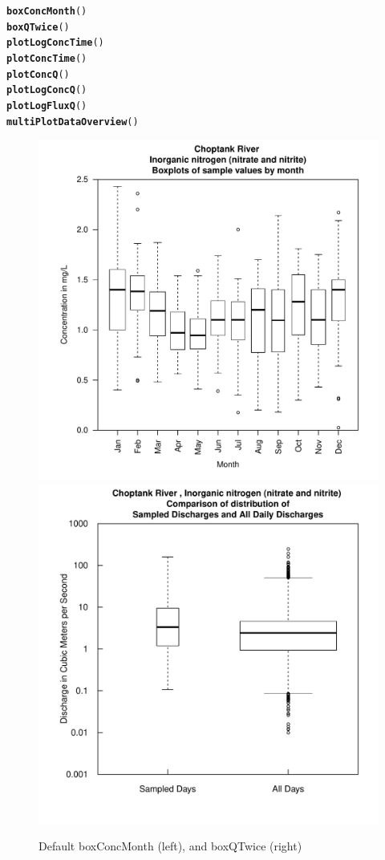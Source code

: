 \documentclass[a4paper,11pt]{article}\usepackage{graphicx, color}
\makeatletter
\newcommand{\hlfunctioncall}[1]{\textcolor[rgb]{0.501960784313725,0,0.329411764705882}{\textbf{#1}}}%
\newenvironment{kframe}{%
 \def\at@end@of@kframe{}%
 \ifinner\ifhmode%
  \def\at@end@of@kframe{\end{minipage}}%
  \begin{minipage}{\columnwidth}%
 \fi\fi%
 \def\FrameCommand##1{\hskip\@totalleftmargin \hskip-\fboxsep
 \colorbox{shadecolor}{##1}\hskip-\fboxsep
     \hskip-\linewidth \hskip-\@totalleftmargin \hskip\columnwidth}%
 \MakeFramed {\advance\hsize-\width
   \@totalleftmargin\z@ \linewidth\hsize
   \@setminipage}}%
 {\par\unskip\endMakeFramed%
 \at@end@of@kframe}
\newenvironment{knitrout}{}{} %
\makeatother
\begin{document}
\begin{knitrout}
\color{fgcolor}\begin{kframe}
\begin{alltt}
\hlfunctioncall{boxConcMonth}()
\hlfunctioncall{boxQTwice}()
\hlfunctioncall{plotLogConcTime}()
\hlfunctioncall{plotConcTime}()
\hlfunctioncall{plotConcQ}()
\hlfunctioncall{plotLogConcQ}()
\hlfunctioncall{plotLogFluxQ}()
\hlfunctioncall{multiPlotDataOverview}()
\end{alltt}
\end{kframe}
\end{knitrout}


\begin{knitrout}
\color{fgcolor}\begin{figure}[]

\includegraphics[width=.5\linewidth,height=.5\linewidth]{figure/plotBoxes1} 
\includegraphics[width=.5\linewidth,height=.5\linewidth]{figure/plotBoxes2} \caption[Default boxConcMonth (left), and boxQTwice (right)]{Default boxConcMonth (left), and boxQTwice (right)\label{fig:plotBoxes}}
\end{figure}


\end{knitrout}
\end{document}
